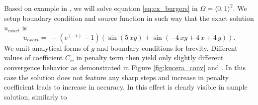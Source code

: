 \begin{example}
\label{ex:kucera}
Based on example in \cite[Section 1.6]{Kucera},
we will solve equation \eqref{eq:ex_burgers} in $\Omega = \langle 0, 1 \rangle^2$.
We setup boundary condition and source function in such way that the exact 
solution $u_{exact}$ is
\begin{equation}
	u_{exact} =  \ -{\left(e^{\left(-t\right)} - 1\right)} {\left(\sin\left(5 \,x 
	y\right) + \sin\left(-4 \, 
	x y + 4 \,x + 4 \, y\right)\right)}.
\end{equation}
We omit analytical forms of $g$ and boundary conditions for brevity.
Different values of coefficient $C_w$ in penalty term then yield only slightly different 
convergence behavior as demonstrated in Figure \ref{fig:kucera_conv} and 
. In this case the solution does not feature any sharp steps and 
increase in penalty coefficient leads to increase in accuracy. In  
this effect is clearly visible in sample solution, similarly to 
\end{example}

